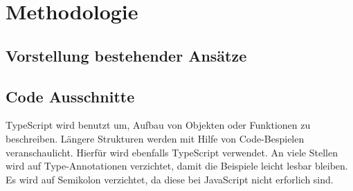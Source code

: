 \chapter{Methodologie}



\section{Vorstellung bestehender Ansätze}



\section{Code Ausschnitte}

TypeScript wird benutzt um, Aufbau von Objekten oder Funktionen zu beschreiben. Längere Strukturen werden mit Hilfe von Code-Bespielen veranschaulicht. Hierfür wird ebenfalls TypeScript verwendet. An viele Stellen wird auf Type-Annotationen verzichtet, damit die Beispiele leicht lesbar bleiben. Es wird auf Semikolon verzichtet, da diese bei JavaScript nicht erforlich sind.